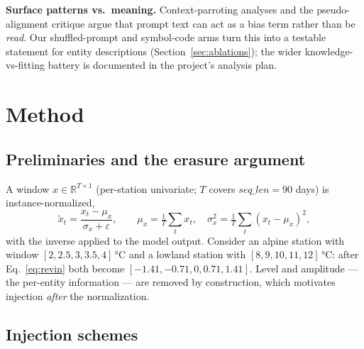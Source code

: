 \documentclass[sigconf,review]{acmart}
\begin{document}
\textbf{Surface patterns vs.\ meaning.} Context-parroting analyses and the
pseudo-alignment critique argue that prompt text can act as a bias term rather than
be \emph{read}. Our shuffled-prompt and symbol-code arms turn this into a testable
statement for entity descriptions (Section~\ref{sec:ablations}); the wider
knowledge-vs-fitting battery is documented in the project's analysis plan.

\section{Method}
\label{sec:method}

\subsection{Preliminaries and the erasure argument}

A window $x \in \mathbb{R}^{T\times 1}$ (per-station univariate; $T$ covers
$\mathit{seq\_len}=90$ days) is instance-normalized,
\begin{equation}
\tilde{x}_t=\frac{x_t-\mu_x}{\sigma_x+\varepsilon},\qquad
\mu_x=\tfrac1T\textstyle\sum_t x_t,\quad
\sigma_x^2=\tfrac1T\textstyle\sum_t (x_t-\mu_x)^2,
\label{eq:revin}
\end{equation}
with the inverse applied to the model output. Consider an alpine station with window
$[2,2.5,3,3.5,4]$\,°C and a lowland station with $[8,9,10,11,12]$\,°C: after
Eq.~\eqref{eq:revin} both become $[-1.41,-0.71,0,0.71,1.41]$. Level and amplitude ---
the per-entity information --- are removed by construction, which motivates
injection \emph{after} the normalization.

\subsection{Injection schemes}
\end{document}
